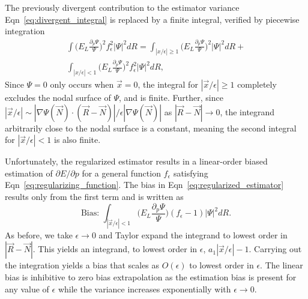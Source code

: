 \documentclass[twocolumn]{revtex4-1}
\begin{document}
The previously divergent contribution to the estimator variance Eqn~\ref{eq:divergent_integral} is replaced by a finite integral, verified by piecewise integration
\begin{equation}
\begin{split}
\int \Big(E_L\frac{\partial_p\Psi}{\Psi}\Big)^2 f_\epsilon^2 |\Psi|^2 dR = \int_{|x/\epsilon|\geq 1} \Big(E_L\frac{\partial_p\Psi}{\Psi}\Big)^2 |\Psi|^2 dR +\\ \int_{|x/\epsilon|< 1} \Big(E_L\frac{\partial_p\Psi}{\Psi}\Big)^2 f_\epsilon^2 |\Psi|^2 dR,
\end{split}
\label{eq:convergent_integral}
\end{equation}
Since $\Psi = 0$ only occurs when $\vec{x} = 0$, the integral for $|\vec{x}/\epsilon|\geq 1$ completely excludes the nodal surface of $\Psi$, and is finite. 
Further, since $|\vec{x}/\epsilon| \sim |\nabla\Psi(\vec{N}) \cdot (\vec{R}-\vec{N})|/\epsilon|\nabla  \Psi(\vec{N})|$ as $|\vec{R} - \vec{N}| \rightarrow 0$, the integrand arbitrarily close to the nodal surface is a constant, meaning the second integral for $|\vec{x}/\epsilon| < 1$ is also finite.

Unfortunately, the regularized estimator results in a linear-order biased estimation of $\partial E/\partial p$ for a general function $f_\epsilon$ satisfying Eqn~\ref{eq:regularizing_function}.
The bias in Eqn~\ref{eq:regularized_estimator} results only from the first term and is written as 
\begin{equation}
\text{Bias: } \int_{|\vec{x}/\epsilon|< 1} \Big(E_L\frac{\partial_p\Psi}{\Psi}\Big) (f_\epsilon - 1)|\Psi|^2 dR.
\label{eq:estimator_bias}
\end{equation}
As before, we take $\epsilon \rightarrow 0$ and Taylor expand the integrand to lowest order in $|\vec{R}-\vec{N}|$.
This yields an integrand, to lowest order in $\epsilon$, $a_1|\vec{x}/\epsilon| - 1$.
Carrying out the integration yields a bias that scales as $O(\epsilon)$ to lowest order in $\epsilon$.
The linear bias is inhibitive to zero bias extrapolation as the estimation bias is present for any value of $\epsilon$ while the variance increases exponentially with $\epsilon \rightarrow 0$.
\end{document}
